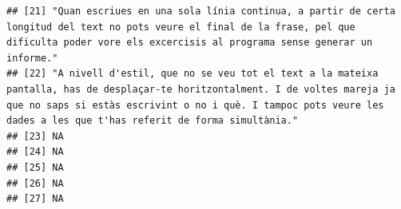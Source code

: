 \documentclass[
]{article}
\begin{document}
\begin{verbatim}
## [21] "Quan escriues en una sola línia continua, a partir de certa longitud del text no pots veure el final de la frase, pel que dificulta poder vore els excercisis al programa sense generar un informe."                                                                                                                                                                                                    
## [22] "A nivell d'estil, que no se veu tot el text a la mateixa pantalla, has de desplaçar-te horitzontalment. I de voltes mareja ja que no saps si estàs escrivint o no i què. I tampoc pots veure les dades a les que t'has referit de forma simultània."                                                                                                                                                    
## [23] NA                                                                                                                                                                                                                                                                                                                                                                                                       
## [24] NA                                                                                                                                                                                                                                                                                                                                                                                                       
## [25] NA                                                                                                                                                                                                                                                                                                                                                                                                       
## [26] NA                                                                                                                                                                                                                                                                                                                                                                                                       
## [27] NA                                                                                                                                                                                                                                                                                                                                                                                                       

\end{verbatim}
\end{document}
